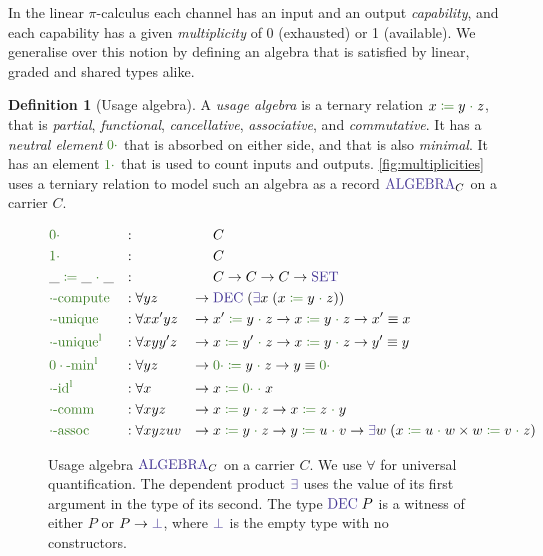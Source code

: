 \documentclass[a4paper,UKenglish,cleveref,autoref,thm-restate,authorcolumns]{lipics-v2019}
\theoremstyle{definition}
\newtheorem{nidefinition}{Definition}
\newcommand{\picalc}{$\pi$-calculus}
\newcommand{\type}[1]{\textcolor{BlueViolet}{\operatorname{#1}}}
\newcommand{\func}[1]{\textcolor{OliveGreen}{\operatorname{#1}}}
\newcommand{\op}[3]{#1 \; \func{\coloneqq} \; #2 \; \func{\cdot} \; #3}
\newcommand{\zero}{\func{0\cdot}}
\newcommand{\one}{\func{1\cdot}}
\newcommand{\Set}{\type{SET}}
\newcommand{\Algebra}{\type{ALGEBRA}}
\begin{document}
In the linear \picalc{} each channel has an input and an output \emph{capability}, and each capability has a given \emph{multiplicity} of 0 (exhausted) or 1 (available).
We generalise over this notion by defining an algebra that is satisfied by linear, graded and shared types alike.

\begin{nidefinition}[Usage algebra]
  A \emph{usage algebra} is a ternary relation $\op{x}{y}{z}$, that is \emph{partial}, \emph{functional}, \emph{cancellative}, \emph{associative}, and \emph{commutative}.
  It has a \emph{neutral element} $\zero$ that is absorbed on either side, and that is also \emph{minimal}.
  It has an element $\one$ that is used to count inputs and outputs.
  \autoref{fig:multiplicities} uses a terniary relation to model such an algebra as a record $\Algebra_C$ on a carrier $C$.

  \begin{figure}[h]
  \begin{equation*}
  \begin{aligned}
    &\zero                  &:{} &                 &        & C \\
    &\one                   &:{} &                 &        & C \\
    &\op{\_}{\_}{\_}        &:{} &                 &        & C \to C \to C \to \Set \\
    &\func{\cdot-compute}  &:{} &\forall y z       & \to \; & \type{DEC} \; (\type{\exists} x  \; (\op{x}{y}{z})) \\
    &\func{\cdot-unique}   &:{} &\forall x x' y z  & \to \; & \op{x'}{y}{z} \to \op{x}{y}{z} \to x' \equiv x \\
    &\func{\cdot-unique^l} &:{} &\forall x y y' z  & \to \; & \op{x}{y'}{z} \to \op{x}{y}{z} \to y' \equiv y \\
    &\func{0\cdot-min^l}   &:{} &\forall y z       & \to \; & \op{\zero}{y}{z} \to y \equiv \zero \\
    &\func{\cdot-id^l}     &:{} &\forall x         & \to \; & \op{x}{\zero}{x} \\
    &\func{\cdot-comm}     &:{} &\forall x y z     & \to \; & \op{x}{y}{z} \to \op{x}{z}{y} \\
    &\func{\cdot-assoc}    &:{} &\forall x y z u v & \to \; & \op{x}{y}{z} \to \op{y}{u}{v} \to \type{\exists} w  \; (\op{x}{u}{w} \times \op{w}{v}{z})
  \end{aligned}
  \end{equation*}
  \caption{
    Usage algebra $\Algebra_C$ on a carrier $C$.
    We use $\forall$ for universal quantification.
    The dependent product $\type{\exists}$ uses the value of its first argument in the type of its second.
    The type $\type{DEC} \; P$ is a witness of either $P$ or $P \to \type{\bot}$, where $\type{\bot}$ is the empty type with no constructors.
  }
  \label{fig:multiplicities}
  \end{figure}
\end{nidefinition}
\end{document}
